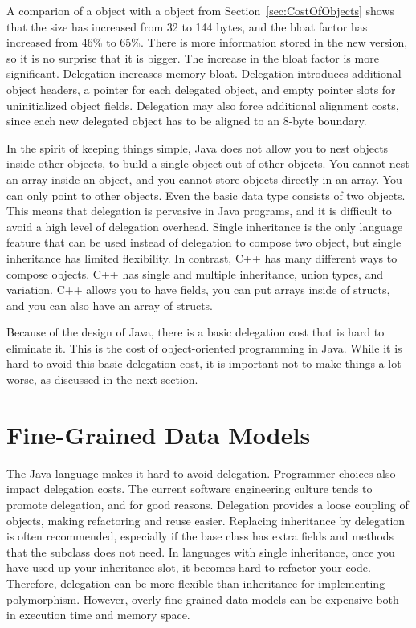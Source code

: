A comparion of a  object with a
 object from Section~\ref{sec:CostOfObjects} shows that
the size has increased from 32 to 144 bytes, and the bloat factor has increased from 46\% to 65\%. There is more information stored in the new version, so it is no surprise that it is bigger. The increase in the bloat factor is more significant. Delegation increases memory bloat. Delegation introduces additional object headers, a pointer for each delegated object, and empty pointer slots for uninitialized object fields. Delegation may also force additional alignment costs, since each new delegated object has to be aligned to an 8-byte boundary.

In the spirit of keeping things simple, Java does not allow you to nest objects
inside other objects, to build a single object out of other objects. You cannot
nest an array inside an object, and you cannot store objects directly in an
array.  You can only point to other objects. Even the basic data type
 consists of two objects. This means that delegation is pervasive
in Java programs, and it is difficult to avoid a high level of delegation
overhead. Single inheritance is the only language feature that can be used
instead of delegation to compose two object, but single inheritance has limited
flexibility.  In contrast, C++ has many different ways to compose objects. C++
has single and multiple inheritance, union types, and variation. C++ allows you
to have  fields, you can put arrays inside of structs, and you can
also have an array of structs.

Because of the design of Java, there is a basic delegation cost that is hard to eliminate it. This is the cost of object-oriented programming in Java. While it is hard to avoid this basic delegation cost, it is important not to make things a lot worse, as discussed in the next section. 

\section{Fine-Grained Data Models}
\label{fine-grained-data-models}

The Java language makes it hard to avoid delegation. Programmer choices also impact delegation costs.  The current software engineering culture tends to promote delegation, and for good reasons. Delegation provides a loose coupling of objects, making refactoring and reuse easier. Replacing inheritance by delegation is often recommended, especially if the base class has extra fields and methods that the subclass does not need. In languages with single inheritance, once you have used up your inheritance slot, it becomes hard to refactor your code. Therefore, delegation can be more flexible than inheritance for implementing polymorphism. However, overly fine-grained data models can be expensive both in execution time and memory space. 


